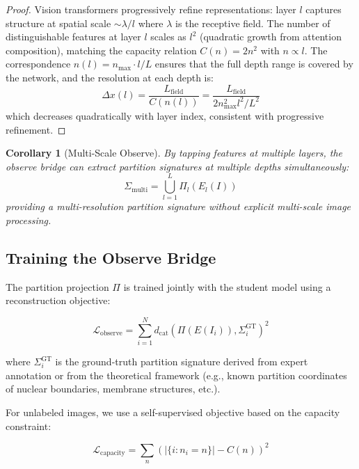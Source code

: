 \documentclass[11pt,a4paper]{article}
\newtheorem{corollary}[theorem]{Corollary}
\theoremstyle{definition}
\theoremstyle{remark}
\newcommand{\dcat}{d_{\mathrm{cat}}}
\newcommand{\Sig}{\Sigma}
\newcommand{\loss}{\mathcal{L}}
\begin{document}
\begin{proof}
Vision transformers progressively refine representations: layer $l$ captures structure at spatial scale $\sim \lambda / l$ where $\lambda$ is the receptive field. The number of distinguishable features at layer $l$ scales as $l^2$ (quadratic growth from attention composition), matching the capacity relation $C(n) = 2n^2$ with $n \propto l$. The correspondence $n(l) = n_{\max} \cdot l/L$ ensures that the full depth range is covered by the network, and the resolution at each depth is:
\begin{equation}
\Delta x(l) = \frac{L_{\text{field}}}{C(n(l))} = \frac{L_{\text{field}}}{2n_{\max}^2 l^2 / L^2}
\end{equation}
which decreases quadratically with layer index, consistent with progressive refinement.
\end{proof}

\begin{corollary}[Multi-Scale Observe]
By tapping features at multiple layers, the observe bridge can extract partition signatures at multiple depths simultaneously:
\begin{equation}
\Sig_{\text{multi}} = \bigcup_{l=1}^{L} \Pi_l(E_l(I))
\end{equation}
providing a multi-resolution partition signature without explicit multi-scale image processing.
\end{corollary}

\subsection{Training the Observe Bridge}

The partition projection $\Pi$ is trained jointly with the student model using a reconstruction objective:

\begin{equation}
\loss_{\text{observe}} = \sum_{i=1}^{N} \dcat(\Pi(E(I_i)), \Sig_i^{\text{GT}})^2
\end{equation}

where $\Sig_i^{\text{GT}}$ is the ground-truth partition signature derived from expert annotation or from the theoretical framework (e.g., known partition coordinates of nuclear boundaries, membrane structures, etc.).

For unlabeled images, we use a self-supervised objective based on the capacity constraint:

\begin{equation}
\loss_{\text{capacity}} = \sum_n \left(|\{i : n_i = n\}| - C(n)\right)^2
\end{equation}
\end{document}
